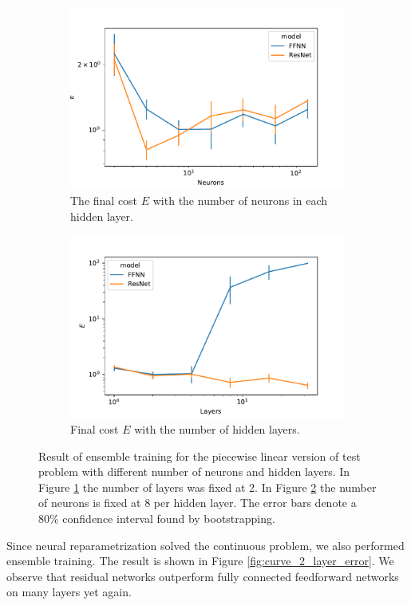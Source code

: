 \begin{figure}[t]
    \begin{subfigure}[t]{0.5\textwidth}
        \centering
        \includegraphics[width=\linewidth]{figures/curve_1_pl/exp_2/neurons_error.pdf}
        \caption{The final cost \(E\) with the number of neurons in each hidden layer.}\label{fig:curve_1_pl_neuron_error}
    \end{subfigure}
    \begin{subfigure}[t]{0.5\textwidth}
        \centering
        \includegraphics[width=\linewidth]{figures/curve_1_pl/exp_2/layer_error.pdf}
        \caption{Final cost \(E\) with the number of hidden layers.}\label{fig:curve_1_pl_layer_error}
    \end{subfigure}
    \caption{Result of ensemble training for the piecewise linear version of test problem with different number of neurons and hidden layers. In Figure \ref{fig:curve_1_pl_neuron_error} the number of layers was fixed at 2. In Figure \ref{fig:curve_1_pl_layer_error} the number of neurons is fixed at 8 per hidden layer. The error bars denote a 80\% confidence interval found by bootstrapping.}\label{fig:curve_1_pl_eks}
\end{figure}

Since neural reparametrization solved the continuous problem, we also performed ensemble training. The result is shown in Figure \ref{fig:curve_2_layer_error}. We observe that residual networks outperform fully connected feedforward networks on many layers yet again. 